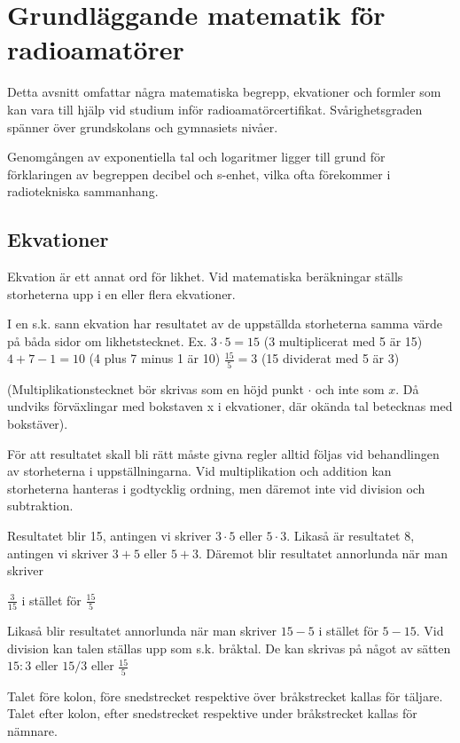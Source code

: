 \chapter{Grundläggande matematik för radioamatörer}

Detta avsnitt omfattar några matematiska begrepp, ekvationer och formler som kan
vara till hjälp vid studium inför radioamatörcertifikat. Svårighetsgraden
spänner över grundskolans och gymnasiets nivåer.

Genomgången av exponentiella tal och logaritmer ligger till grund för
förklaringen av begreppen decibel och s-enhet, vilka ofta förekommer i
radiotekniska sammanhang.

\section{Ekvationer}

Ekvation är ett annat ord för likhet. Vid matematiska beräkningar ställs
storheterna upp i en eller flera ekvationer.

I en s.k. sann ekvation har resultatet av de uppställda storheterna samma värde
på båda sidor om likhetstecknet.
Ex. $3 \cdot 5 = 15$ (3 multiplicerat med 5 är 15)
$4 + 7 - 1 = 10$ (4 plus 7 minus 1 är 10)
$\frac{15}{5} = 3$ (15 dividerat med 5 är 3)

(Multiplikationstecknet bör skrivas som en höjd punkt $\cdot$ och inte som $x$.
Då undviks förväxlingar med bokstaven x i ekvationer, där okända tal betecknas
med bokstäver).

För att resultatet skall bli rätt måste givna regler alltid följas vid
behandlingen av storheterna i uppställningarna. Vid multiplikation och addition
kan storheterna hanteras i godtycklig ordning, men däremot inte vid division och
subtraktion.

Resultatet blir 15, antingen vi skriver $3 \cdot 5$ eller $5 \cdot 3$.
Likaså är resultatet 8, antingen vi skriver $3 + 5$ eller $5 + 3$.
Däremot blir resultatet annorlunda när man skriver

$\frac{3}{15}$ i stället för $\frac{15}{5}$

Likaså blir resultatet annorlunda när man skriver $15 - 5$ i stället för
$5 - 15$. Vid division kan talen ställas upp som s.k. bråktal. De kan skrivas på
något av sätten $15:3$ eller $15/3$ eller $\frac{15}{5}$

Talet före kolon, före snedstrecket respektive över bråkstrecket kallas för
täljare.
Talet efter kolon, efter snedstrecket respektive under bråkstrecket kallas för
nämnare.


